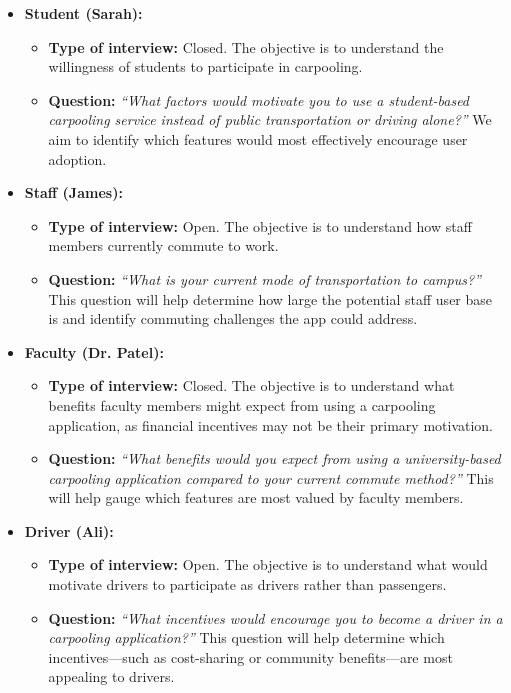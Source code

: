 \documentclass[12pt,letterpaper]{article}
\begin{document}
\begin{itemize}
    \item \textbf{Student (Sarah):}
    \begin{itemize}
        \item \textbf{Type of interview:} Closed. The objective is to understand the willingness of students to participate in carpooling.
        \item \textbf{Question:} \textit{“What factors would motivate you to use a student-based carpooling service instead of public transportation or driving alone?”}  
        We aim to identify which features would most effectively encourage user adoption.
    \end{itemize}

    \item \textbf{Staff (James):}
    \begin{itemize}
        \item \textbf{Type of interview:} Open. The objective is to understand how staff members currently commute to work.
        \item \textbf{Question:} \textit{“What is your current mode of transportation to campus?”}  
        This question will help determine how large the potential staff user base is and identify commuting challenges the app could address.
    \end{itemize}

    \item \textbf{Faculty (Dr. Patel):}
    \begin{itemize}
        \item \textbf{Type of interview:} Closed. The objective is to understand what benefits faculty members might expect from using a carpooling application, as financial incentives may not be their primary motivation.
        \item \textbf{Question:} \textit{“What benefits would you expect from using a university-based carpooling application compared to your current commute method?”}  
        This will help gauge which features are most valued by faculty members.
    \end{itemize}

    \item \textbf{Driver (Ali):}
    \begin{itemize}
        \item \textbf{Type of interview:} Open. The objective is to understand what would motivate drivers to participate as drivers rather than passengers.
        \item \textbf{Question:} \textit{“What incentives would encourage you to become a driver in a carpooling application?”}  
        This question will help determine which incentives—such as cost-sharing or community benefits—are most appealing to drivers.
    \end{itemize}


\end{itemize}
\end{document}
